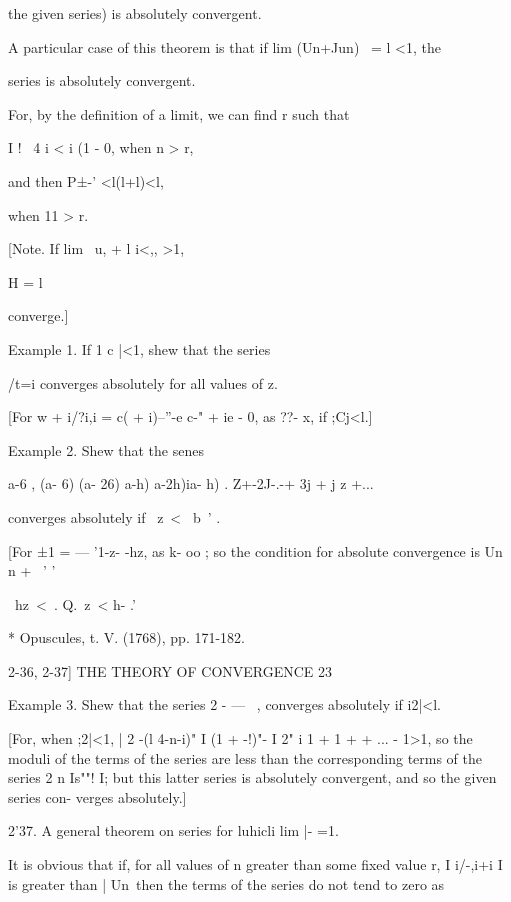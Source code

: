 the given series) is absolutely convergent. 

A particular case of this theorem is that if lim (Un+Jun) \ = l <1, the 

series is absolutely convergent. 

For, by the definition of a limit, we can find r such that 



I !  \  4 i < i (1 - 0, when n > r, 



and then P±-' <l(l+l)<l, 

when 11 > r. 

[Note. If lim \ u,  + l i<,,  >1, %

H = l 

converge.] 

Example 1. If 1 c |<1, shew that the series 

/t=i 
converges absolutely for all values of z. 

[For w  + i/?i,i = c(  + i)--''-e c-" + ie - 0, as ??- x, if ;Cj<l.] 

Example 2. Shew that the senes 



a-6 , (a- 6) (a- 26)    a-h) a-2h)ia- h) . 
Z+-2J-.-+ 3j  + j  z +... 

converges absolutely if \ z\ < \ b~' . 



[For   ±1 =   — '1-z- -hz, as k- oo ; so the condition for absolute convergence is 
   Un n + \ ' ' 

\ hz\ < \,. Q.\ z\ < h- .'\ 

* Opuscules, t. V. (1768), pp. 171-182. 



2-36, 2-37] THE THEORY OF CONVERGENCE 23 

Example 3. Shew that the series 2 - — \  ,  converges absolutely if i2|<l. 

[For, when ;2|<1, | 2 -(l 4-n-i)" I   (1 + -!)"- I 2" i   1 + 1 +  + ... - 1>1, so the 
moduli of the terms of the series are less than the corresponding terms of the series 
2 n Is""! I; but this latter series is absolutely convergent, and so the given series con- 
verges absolutely.] 

2'37. A general theorem on series for luhicli lim |-  =1. 

It is obvious that if, for all values of n greater than some fixed value r, 
I i/-,i+i I is greater than | Un\, then the terms of the series do not tend to zero as 

